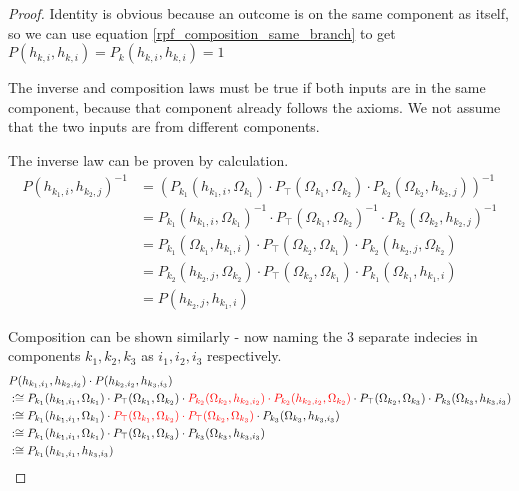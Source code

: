 \documentclass[twoside]{article}
\theoremstyle{plain}%
\theoremstyle{definition}
\theoremstyle{remark}
\begin{document}
\begin{proof}
Identity is obvious because an outcome is on the same component as itself, so we can use equation \ref{rpf_composition_same_branch} to get \(P(h_{k, i}, h_{k, i}) = P_k(h_{k, i}, h_{k, i}) = 1\)

The inverse and composition laws must be true if both inputs are in the same component, because that component already follows the axioms. We not assume that the two inputs are from different components.

The inverse law can be proven by calculation.
\begin{equation}
\begin{aligned}
P(h_{k_1, i}, h_{k_2, j})^{-1} &= (P_{k_1}(h_{k_1, i}, \Omega_{k_1}) \cdot  P_{\top}(\Omega_{k_1}, \Omega_{k_2}) \cdot P_{k_2}(\Omega_{k_2}, h_{k_2, j}))^{-1} \\
& = P_{k_1}(h_{k_1, i}, \Omega_{k_1})^{-1} \cdot  P_{\top}(\Omega_{k_1}, \Omega_{k_2})^{-1} \cdot P_{k_2}(\Omega_{k_2}, h_{k_2, j})^{-1} \\
& = P_{k_1}(\Omega_{k_1}, h_{k_1, i}) \cdot  P_{\top}(\Omega_{k_2}, \Omega_{k_1}) \cdot P_{k_2}(h_{k_2, j}, \Omega_{k_2}) \\
& = P_{k_2}(h_{k_2, j}, \Omega_{k_2})\cdot  P_{\top}(\Omega_{k_2}, \Omega_{k_1}) \cdot P_{k_1}(\Omega_{k_1}, h_{k_1, i}) \\
& = P(h_{k_2, j}, h_{k_1, i})
\end{aligned}
\end{equation}

Composition can be shown similarly - now naming the 3 separate indecies in components \(k_1, k_2, k_3\) as \(i_1, i_2, i_3\) respectively.
\begin{equation}
\begin{aligned}
& P(h_{k_1, i_1}, h_{k_2, i_2}) \cdot P(h_{k_2, i_2}, h_{k_3, i_3}) \\
& :\cong P_{k_1}(h_{k_1, i_1}, \Omega_{k_1}) \cdot  P_{\top}(\Omega_{k_1}, \Omega_{k_2}) \cdot \textcolor{red}{P_{k_2}(\Omega_{k_2}, h_{k_2, i_2}) \cdot  P_{k_2}(h_{k_2, i_2}, \Omega_{k_2})} \cdot  P_{\top}(\Omega_{k_2}, \Omega_{k_3}) \cdot P_{k_3}(\Omega_{k_3}, h_{k_3, i_3}) \\
& :\cong P_{k_1}(h_{k_1, i_1}, \Omega_{k_1}) \cdot  \textcolor{red}{P_{\top}(\Omega_{k_1}, \Omega_{k_2}) \cdot  P_{\top}(\Omega_{k_2}, \Omega_{k_3})} \cdot P_{k_3}(\Omega_{k_3}, h_{k_3, i_3}) \\
& :\cong P_{k_1}(h_{k_1, i_1}, \Omega_{k_1}) \cdot  P_{\top}(\Omega_{k_1}, \Omega_{k_3}) \cdot P_{k_3}(\Omega_{k_3}, h_{k_3, i_3}) \\
& :\cong P_{k_1}(h_{k_1, i_1}, h_{k_3, i_3})
\end{aligned}
\end{equation}
\end{proof}
\end{document}
